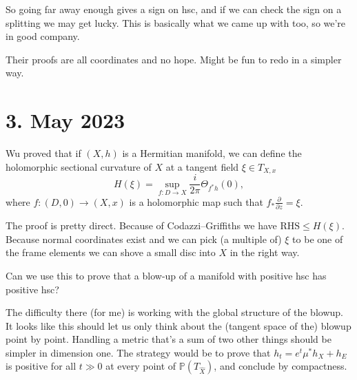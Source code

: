 \documentclass[11pt]{amsart}
\theoremstyle{definition}
\newcommand{\kk}[1]{\mathbb{#1}}
\begin{document}
So going far away enough gives a sign on hsc, and if we can check the sign on a
splitting we may get lucky.
This is basically what we came up with too, so we're in good company.

Their proofs are all coordinates and no hope.
Might be fun to redo in a simpler way.



\section{3. May 2023}

Wu proved that if $(X,h)$ is a Hermitian manifold, we can define the
holomorphic sectional curvature of $X$ at a tangent field $\xi \in T_{X,x}$
$$
H(\xi) = \sup_{f:D\to X}\frac{i}{2\pi}\Theta_{f^*h}(0),
$$
where $f : (D,0) \to (X,x)$ is a holomorphic map such that
$f_*\frac{\partial}{\partial z} = \xi$.

The proof is pretty direct.
Because of Codazzi--Griffiths we have $\text{RHS} \leq H(\xi)$.
Because normal coordinates exist and we can pick (a multiple of) $\xi$ to be
one of the frame elements we can shove a small disc into $X$ in the right way.

Can we use this to prove that a blow-up of a manifold with positive hsc has
positive hsc?

The difficulty there (for me) is working with the global structure of the blowup.
It looks like this should let us only think about the (tangent space of the)
blowup point by point.
Handling a metric that's a sum of two other things should be simpler in
dimension one.
The strategy would be to prove that $h_t = e^t \mu^* h_X + h_{E}$ is positive
for all $t \gg 0$ at every point of $\kk P(T_{\widehat X})$, and conclude by
compactness.
\end{document}
